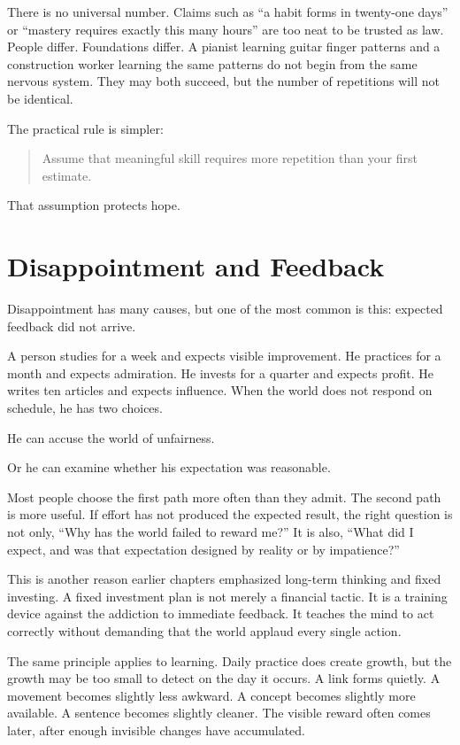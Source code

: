 There is no universal number. Claims such as ``a habit forms in twenty-one days'' or ``mastery requires exactly this many hours'' are too neat to be trusted as law. People differ. Foundations differ. A pianist learning guitar finger patterns and a construction worker learning the same patterns do not begin from the same nervous system. They may both succeed, but the number of repetitions will not be identical.

The practical rule is simpler:

\begin{quote}
Assume that meaningful skill requires more repetition than your first estimate.
\end{quote}

That assumption protects hope.

\section*{Disappointment and Feedback}

Disappointment has many causes, but one of the most common is this: expected feedback did not arrive.

A person studies for a week and expects visible improvement. He practices for a month and expects admiration. He invests for a quarter and expects profit. He writes ten articles and expects influence. When the world does not respond on schedule, he has two choices.

He can accuse the world of unfairness.

Or he can examine whether his expectation was reasonable.

Most people choose the first path more often than they admit. The second path is more useful. If effort has not produced the expected result, the right question is not only, ``Why has the world failed to reward me?'' It is also, ``What did I expect, and was that expectation designed by reality or by impatience?''

This is another reason earlier chapters emphasized long-term thinking and fixed investing. A fixed investment plan is not merely a financial tactic. It is a training device against the addiction to immediate feedback. It teaches the mind to act correctly without demanding that the world applaud every single action.

The same principle applies to learning. Daily practice does create growth, but the growth may be too small to detect on the day it occurs. A link forms quietly. A movement becomes slightly less awkward. A concept becomes slightly more available. A sentence becomes slightly cleaner. The visible reward often comes later, after enough invisible changes have accumulated.

